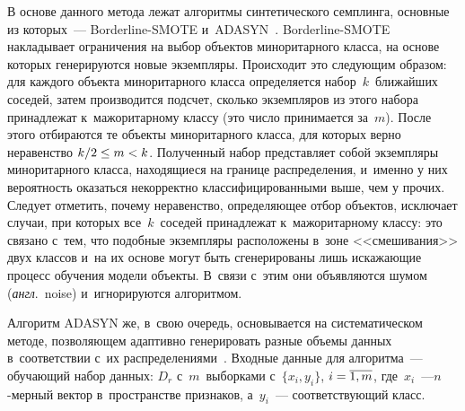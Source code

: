 \begin{multicols}{2}
  В основе данного метода лежат алгоритмы синтетического семплинга, 
основные из которых~--- Borderline-SMOTE и~ADASYN~\cite{6-sev, 7-sev}.
 Borderline-SMOTE накладывает ограничения на 
выбор \mbox{объектов} миноритарного класса, на основе которых генерируются новые 
экземпляры. Происходит это следующим образом: для каждого объекта 
миноритарного класса определяется набор~$k$~ближайших соседей, затем 
производится подсчет, сколько экземпляров из этого набора принадлежат 
к~мажоритарному классу (это число принимается за~$m$). После этого 
отбираются те объекты миноритарного класса, для которых верно неравенство  
  $k/2\hm\leq m\hm<k$. Полученный набор представляет собой экземпляры 
миноритарного класса, находящиеся на границе распределения, и~именно у них 
вероятность оказаться некорректно классифицированными выше, чем у прочих. 
Следует отметить, почему неравенство, определяющее отбор объектов, 
исключает случаи, при которых все~$k$~соседей принадлежат 
к~мажоритарному классу: это связано с~тем, что подобные экземпляры 
расположены в~зоне <<смешивания>> двух классов и~на их основе могут быть 
сгенерированы лишь искажающие процесс обучения модели объекты. В~связи 
с~этим они объявляются шумом (\textit{англ}.\ noise) и~игнорируются алгоритмом. 
  
  Алгоритм ADASYN же, в~свою очередь, основывается на систематическом 
методе, позволяющем адаптивно генерировать разные объемы данных 
в~соответствии с~их распределениями~\cite{6-sev}. Входные данные для 
алгоритма~--- обучающий набор данных: $D_r$ с~$m$~выборками с~$\{x_i, 
y_i\}$, $i\hm=\overline{1,m}$, где~$x_i$~---\linebreak $n$-мер\-ный вектор 
в~пространстве признаков, а~$y_i$~--- соответствующий класс. 


\end{multicols}
